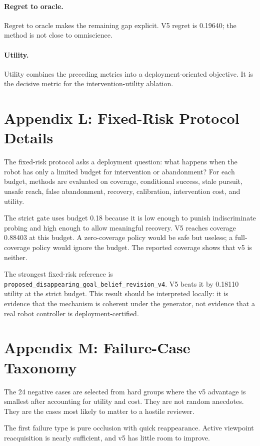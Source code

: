 \documentclass{article}
\begin{document}
\paragraph{Regret to oracle.}
Regret to oracle makes the remaining gap explicit. V5 regret is 0.19640; the method is not close to omniscience.

\paragraph{Utility.}
Utility combines the preceding metrics into a deployment-oriented objective. It is the decisive metric for the intervention-utility ablation.

\section{Appendix L: Fixed-Risk Protocol Details}
The fixed-risk protocol asks a deployment question: what happens when the robot has only a limited budget for intervention or abandonment? For each budget, methods are evaluated on coverage, conditional success, stale pursuit, unsafe reach, false abandonment, recovery, calibration, intervention cost, and utility.

The strict gate uses budget 0.18 because it is low enough to punish indiscriminate probing and high enough to allow meaningful recovery. V5 reaches coverage 0.88403 at this budget. A zero-coverage policy would be safe but useless; a full-coverage policy would ignore the budget. The reported coverage shows that v5 is neither.

The strongest fixed-risk reference is \texttt{proposed\_disappearing\_goal\_belief\_revision\_v4}. V5 beats it by 0.18110 utility at the strict budget. This result should be interpreted locally: it is evidence that the mechanism is coherent under the generator, not evidence that a real robot controller is deployment-certified.

\section{Appendix M: Failure-Case Taxonomy}
The 24 negative cases are selected from hard groups where the v5 advantage is smallest after accounting for utility and cost. They are not random anecdotes. They are the cases most likely to matter to a hostile reviewer.

The first failure type is pure occlusion with quick reappearance. Active viewpoint reacquisition is nearly sufficient, and v5 has little room to improve.
\end{document}
